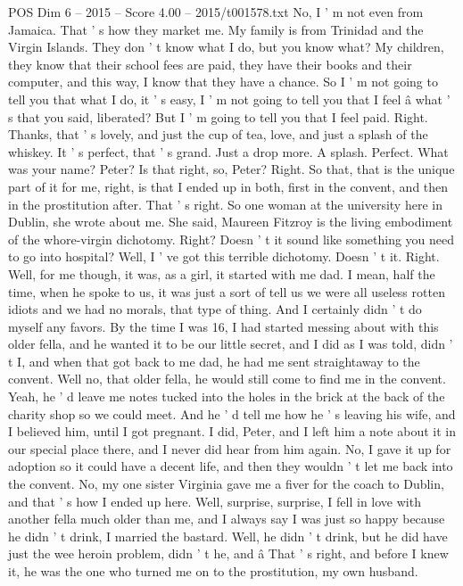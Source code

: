 \begin{textsample}{POS Dim 6 – 2015 – Score 4.00 – 2015/t001578.txt}
No, I ' m not even from Jamaica.
That ' s how they market me.
My family is from Trinidad and the Virgin Islands.
They don ' t know what I do, but you know what?
My children, they know that their school fees are paid, they have their books and their computer, and this way, I know that they have a chance.
So I ' m not going to tell you that what I do, it ' s easy, I ' m not going to tell you that I feel â what ' s that you said, liberated?
But I ' m going to tell you that I feel paid.
Right.
Thanks, that ' s lovely, and just the cup of tea, love, and just a splash of the whiskey.
It ' s perfect, that ' s grand.
Just a drop more.
A splash.
Perfect.
What was your name?
Peter?
Is that right, so, Peter?
Right.
So that, that is the unique part of it for me, right, is that I ended up in both, first in the convent, and then in the prostitution after.
That ' s right.
So one woman at the university here in Dublin, she wrote about me.
She said, Maureen Fitzroy is the living embodiment of the whore-virgin dichotomy.
Right?
Doesn ' t it sound like something you need to go into hospital?
Well, I ' ve got this terrible dichotomy.
Doesn ' t it.
Right.
Well, for me though, it was, as a girl, it started with me dad.
I mean, half the time, when he spoke to us, it was just a sort of tell us we were all useless rotten idiots and we had no morals, that type of thing.
And I certainly didn ' t do myself any favors.
By the time I was 16, I had started messing about with this older fella, and he wanted it to be our little secret, and I did as I was told, didn ' t I, and when that got back to me dad, he had me sent straightaway to the convent.
Well no, that older fella, he would still come to find me in the convent.
Yeah, he ' d leave me notes tucked into the holes in the brick at the back of the charity shop so we could meet.
And he ' d tell me how he ' s leaving his wife, and I believed him, until I got pregnant.
I did, Peter, and I left him a note about it in our special place there, and I never did hear from him again.
No, I gave it up for adoption so it could have a decent life, and then they wouldn ' t let me back into the convent.
No, my one sister Virginia gave me a fiver for the coach to Dublin, and that ' s how I ended up here.
Well, surprise, surprise, I fell in love with another fella much older than me, and I always say I was just so happy because he didn ' t drink, I married the bastard.
Well, he didn ' t drink, but he did have just the wee heroin problem, didn ' t he, and â That ' s right, and before I knew it, he was the one who turned me on to the prostitution, my own husband.

\end{textsample}
